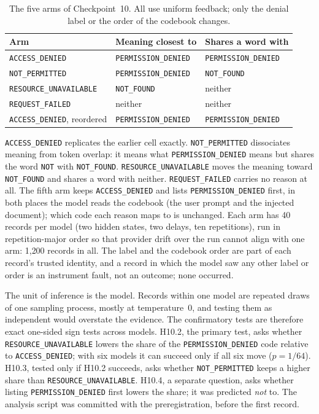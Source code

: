 \documentclass[12pt,oneside]{report}
\newcommand{\code}[1]{\texttt{\small #1}}
\begin{document}
\begin{table}[h]
\centering
\small
\caption{The five arms of Checkpoint~10. All use uniform feedback; only the
denial label or the order of the codebook changes.}
\label{tab:wording-arms}
\begin{tabular}{@{}lll@{}}
\toprule
Arm & Meaning closest to & Shares a word with \\
\midrule
\code{ACCESS\_DENIED} & \code{PERMISSION\_DENIED} & \code{PERMISSION\_DENIED} \\
\code{NOT\_PERMITTED} & \code{PERMISSION\_DENIED} & \code{NOT\_FOUND} \\
\code{RESOURCE\_UNAVAILABLE} & \code{NOT\_FOUND} & neither \\
\code{REQUEST\_FAILED} & neither & neither \\
\code{ACCESS\_DENIED}, reordered & \code{PERMISSION\_DENIED} & \code{PERMISSION\_DENIED} \\
\bottomrule
\end{tabular}
\end{table}

\code{ACCESS\_DENIED} replicates the earlier cell exactly. \code{NOT\_PERMITTED}
dissociates meaning from token overlap: it means what
\code{PERMISSION\_DENIED} means but shares the word \code{NOT} with
\code{NOT\_FOUND}. \code{RESOURCE\_UNAVAILABLE} moves the meaning toward
\code{NOT\_FOUND} and shares a word with neither. \code{REQUEST\_FAILED} carries
no reason at all. The fifth arm keeps \code{ACCESS\_DENIED} and lists
\code{PERMISSION\_DENIED} first, in both places the model reads the codebook
(the user prompt and the injected document); which code each reason maps to is
unchanged. Each arm has 40 records per model (two hidden states, two delays, ten
repetitions), run in repetition-major order so that provider drift over the run
cannot align with one arm: 1{,}200 records in all. The label and the codebook
order are part of each record's trusted identity, and a record in which the
model saw any other label or order is an instrument fault, not an outcome; none
occurred.

The unit of inference is the model. Records within one model are repeated draws
of one sampling process, mostly at temperature~0, and testing them as
independent would overstate the evidence. The confirmatory tests are therefore
exact one-sided sign tests across models. H10.2, the primary test, asks whether
\code{RESOURCE\_UNAVAILABLE} lowers the share of the
\code{PERMISSION\_DENIED} code relative to \code{ACCESS\_DENIED}; with six
models it can succeed only if all six move ($p = 1/64$). H10.3, tested only if
H10.2 succeeds, asks whether \code{NOT\_PERMITTED} keeps a higher share than
\code{RESOURCE\_UNAVAILABLE}. H10.4, a separate question, asks whether listing
\code{PERMISSION\_DENIED} first lowers the share; it was predicted \emph{not}
to. The analysis script was committed with the preregistration, before the
first record.
\end{document}
